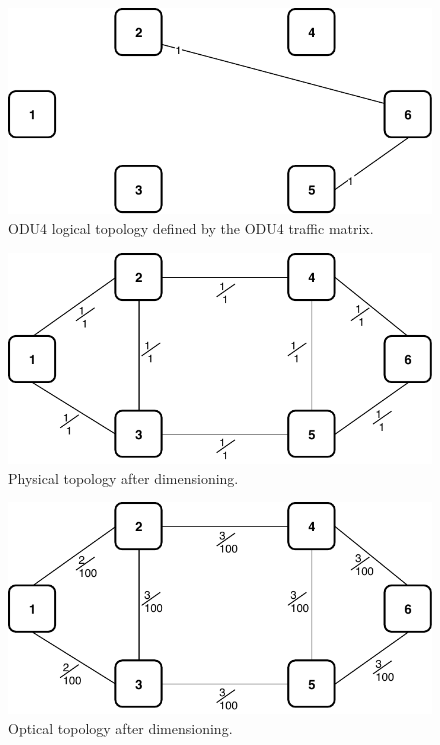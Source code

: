 \begin{figure}[h!]
\centering
\includegraphics[width=12cm]{sdf/ilp/opaque_protection/figures/logical_topology_ODU4_low}
\caption{ODU4 logical topology defined by the ODU4 traffic matrix.}
\label{logical_ODU4_protectionlow}
\end{figure}

\begin{figure}[h!]
\centering
\includegraphics[width=13cm]{sdf/ilp/opaque_protection/figures/physical_topology}
\caption{Physical topology after dimensioning.}
\label{physical_protectionlow}
\end{figure}

\vspace{17pt}

\begin{figure}[h!]
\centering
\includegraphics[width=13cm]{sdf/ilp/opaque_protection/figures/optical_topology_low}
\caption{Optical topology after dimensioning.}
\label{optical_protectionlow}
\end{figure}

